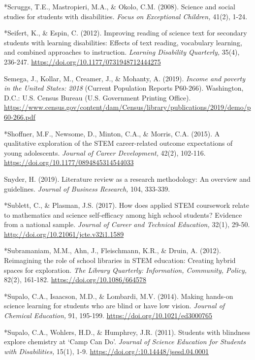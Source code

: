 \documentclass[11.5pt]{sig-alternate}
\begin{document}
*Scruggs, T.E., Mastropieri, M.A., \& Okolo, C.M. (2008). Science and social studies for students with disabilities. \textit{Focus on Exceptional Children,} 41(2), 1-24.

*Seifert, K., \& Espin, C. (2012). Improving reading of science text for secondary students with learning disabilities: Effects of text reading, vocabulary learning, and combined approaches to instruction. \textit{Learning Disability Quarterly,} 35(4), 236-247. \url{https://doi.org/10.1177/0731948712444275}

Semega, J., Kollar, M., Creamer, J., \& Mohanty, A. (2019). \textit{Income and poverty in the United States: 2018} (Current Population Reports P60-266). Washington, D.C.: U.S. Census Bureau (U.S. Government Printing Office). \url{https://www.census.gov/content/dam/Census/library/publications/2019/demo/p60-266.pdf}

*Shoffner, M.F., Newsome, D., Minton, C.A., \& Morris, C.A. (2015). A qualitative exploration of the STEM career-related outcome expectations of young adolescents. \textit{Journal of Career Development,} 42(2), 102-116. \url{https://doi.org/10.1177/0894845314544033}

Snyder, H. (2019). Literature review as a research methodology: An overview and guidelines. \textit{Journal of Business Research,} 104, 333-339.

*Sublett, C., \& Plasman, J.S. (2017). How does applied STEM coursework relate to mathematics and science self-efficacy among high school students? Evidence from a national sample. \textit{Journal of Career and Technical Education,} 32(1), 29-50. \url{http://doi.org/10.21061/jcte.v32i1.1589}

*Subramaniam, M.M., Ahn, J., Fleischmann, K.R., \& Druin, A. (2012). Reimagining the role of school libraries in STEM education: Creating hybrid spaces for exploration. \textit{The Library Quarterly: Information, Community, Policy,} 82(2), 161-182. \url{https://doi.org/10.1086/664578}

*Supalo, C.A., Isaacson, M.D., \& Lombardi, M.V. (2014). Making hands-on science learning for students who are blind or have low vision. \textit{Journal of Chemical Education,} 91, 195-199. \url{https://doi.org/10.1021/ed3000765}

*Supalo, C.A., Wohlers, H.D., \& Humphrey, J.R. (2011). Students with blindness explore chemistry at ‘Camp Can Do’. \textit{Journal of Science Education for Students with Disabilities,} 15(1), 1-9. \url{https://doi.org/:10.14448/jsesd.04.0001}
\end{document}
